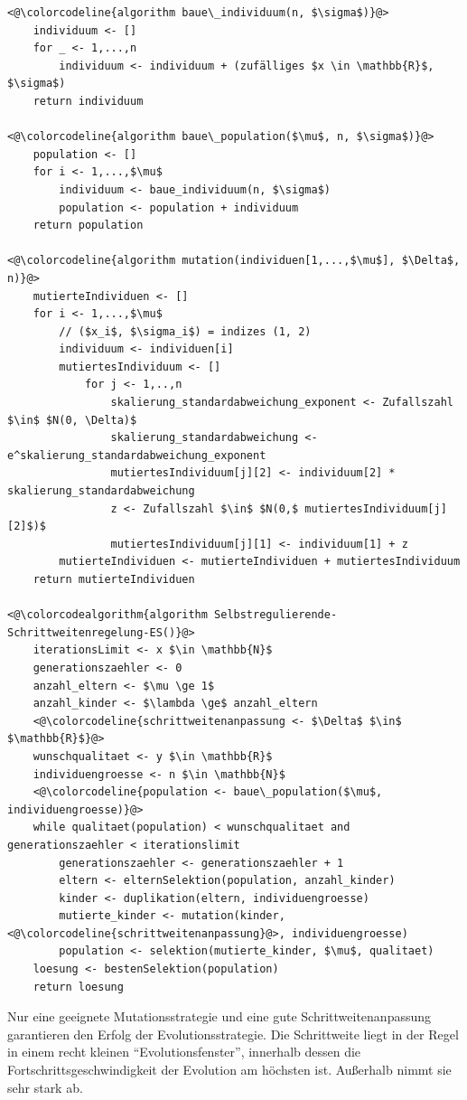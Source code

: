 \begin{lstlisting}[caption={Selbstregulierende Schrittweitenanpassung je Vektorwert}, firstnumber=1, captionpos=b, label=lst:selbstregulierende_schrittweitenanpassung_es]
<@\colorcodeline{algorithm baue\_individuum(n, $\sigma$)}@>
	individuum <- []
	for _ <- 1,...,n
		individuum <- individuum + (zufälliges $x \in \mathbb{R}$, $\sigma$)
	return individuum
	
<@\colorcodeline{algorithm baue\_population($\mu$, n, $\sigma$)}@>
	population <- []
	for i <- 1,...,$\mu$
		individuum <- baue_individuum(n, $\sigma$)
		population <- population + individuum
	return population

<@\colorcodeline{algorithm mutation(individuen[1,...,$\mu$], $\Delta$, n)}@>
	mutierteIndividuen <- []
	for i <- 1,...,$\mu$
		// ($x_i$, $\sigma_i$) = indizes (1, 2)
		individuum <- individuen[i]
		mutiertesIndividuum <- []
			for j <- 1,..,n
				skalierung_standardabweichung_exponent <- Zufallszahl $\in$ $N(0, \Delta)$
				skalierung_standardabweichung <- e^skalierung_standardabweichung_exponent
				mutiertesIndividuum[j][2] <- individuum[2] * skalierung_standardabweichung
				z <- Zufallszahl $\in$ $N(0,$ mutiertesIndividuum[j][2]$)$
				mutiertesIndividuum[j][1] <- individuum[1] + z
		mutierteIndividuen <- mutierteIndividuen + mutiertesIndividuum
	return mutierteIndividuen

<@\colorcodealgorithm{algorithm Selbstregulierende-Schrittweitenregelung-ES()}@>
	iterationsLimit <- x $\in \mathbb{N}$
	generationszaehler <- 0
	anzahl_eltern <- $\mu \ge 1$
	anzahl_kinder <- $\lambda \ge$ anzahl_eltern
	<@\colorcodeline{schrittweitenanpassung <- $\Delta$ $\in$ $\mathbb{R}$}@>
	wunschqualitaet <- y $\in \mathbb{R}$
	individuengroesse <- n $\in \mathbb{N}$
	<@\colorcodeline{population <- baue\_population($\mu$, individuengroesse)}@>
	while qualitaet(population) < wunschqualitaet and generationszaehler < iterationslimit
		generationszaehler <- generationszaehler + 1
		eltern <- elternSelektion(population, anzahl_kinder)
		kinder <- duplikation(eltern, individuengroesse)
		mutierte_kinder <- mutation(kinder, <@\colorcodeline{schrittweitenanpassung}@>, individuengroesse)
		population <- selektion(mutierte_kinder, $\mu$, qualitaet)
	loesung <- bestenSelektion(population)
	return loesung
\end{lstlisting}

Nur eine geeignete Mutationsstrategie und eine gute Schrittweitenanpassung garantieren den Erfolg der Evolutionsstrategie.
Die Schrittweite liegt in der Regel in einem recht kleinen \enquote{Evolutionsfenster}, innerhalb dessen die Fortschrittsgeschwindigkeit der Evolution am höchsten ist. Außerhalb nimmt sie sehr stark ab.
